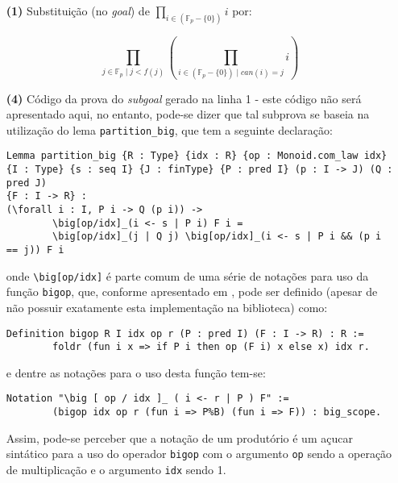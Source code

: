 \begin{enumerate}[label=\textbf{\roman*.}]
\begin{enumerate}[listparindent=\parindent]
                \item[\textbf{(1)}] Substituição (no \textit{goal}) de $\prod_{i \in (\mathbb{F}_p - \{0\})} i$ por:
                
                        \begin{equation*}
                        \prod_{j \in \mathbb{F}_p \mid j < f(j)} \left( \prod_{i \in (\mathbb{F}_p - \{0\}) \mid can(i)= j} i \right)
                        \end{equation*}

                \item[\textbf{(4)}] Código da prova do \textit{subgoal} gerado na linha 1 - este código não será apresentado aqui, no entanto, pode-se dizer que tal subprova se baseia na utilização do lema \lstinline[language=coq]|partition_big|, que tem a seguinte declaração:
                
                        \begin{lstlisting}[language=coq,frame=single,tabsize=1]
Lemma partition_big {R : Type} {idx : R} {op : Monoid.com_law idx} 
{I : Type} {s : seq I} {J : finType} {P : pred I} (p : I -> J) (Q : pred J) 
{F : I -> R} :
(\forall i : I, P i -> Q (p i)) ->
        \big[op/idx]_(i <- s | P i) F i =
        \big[op/idx]_(j | Q j) \big[op/idx]_(i <- s | P i && (p i == j)) F i
                        \end{lstlisting}
                onde \lstinline[language=coq]|\big[op/idx]| é parte comum de uma série de notações para uso da função \lstinline[language=coq]|bigop|, que, conforme apresentado em \cite{assia_mahboubi_2022_7118596}, pode ser definido (apesar de não possuir exatamente esta implementação na biblioteca) como:

                        \begin{lstlisting}[language=coq,frame=single,tabsize=1]
Definition bigop R I idx op r (P : pred I) (F : I -> R) : R :=
        foldr (fun i x => if P i then op (F i) x else x) idx r.
                        \end{lstlisting}
                e dentre as notações para o uso desta função tem-se:

                        \begin{lstlisting}[language=coq,frame=single,tabsize=1]
Notation "\big [ op / idx ]_ ( i <- r | P ) F" :=
        (bigop idx op r (fun i => P%B) (fun i => F)) : big_scope.
                        \end{lstlisting}
                Assim, pode-se perceber que a notação de um produtório é um açucar sintático para a uso do operador \lstinline[language=coq]|bigop| com o argumento \lstinline[language=coq]|op| sendo a operação de multiplicação e o argumento \lstinline[language=coq]|idx| sendo 1. 
                

\end{enumerate}
\end{enumerate}
